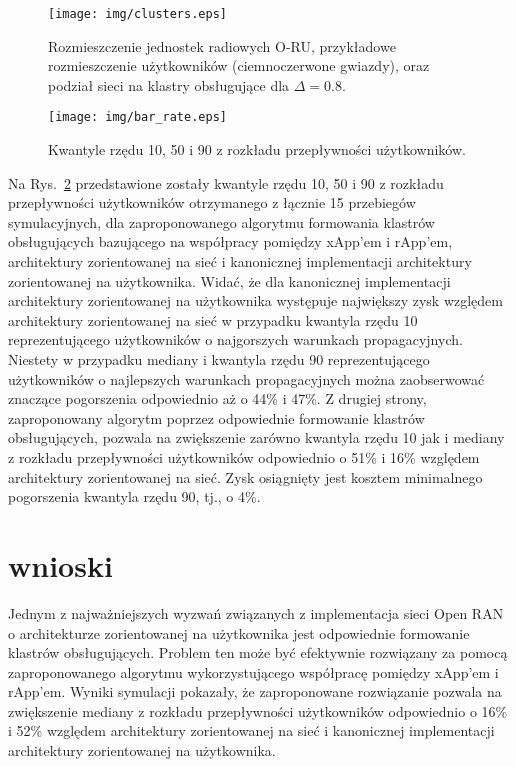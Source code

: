 \documentclass[a4paper]{article}
\begin{document}
\begin{multicols}{2}
\begin{figure}[H]
\centering
\texttt{[image: img/clusters.eps]}
\caption{Rozmieszczenie jednostek radiowych O-RU, przykładowe rozmieszczenie użytkowników (ciemnoczerwone gwiazdy), oraz podział sieci na klastry obsługujące dla $\Delta=0.8$.}
\label{fig:clusters}
\end{figure}
\begin{figure}[H]
\centering
\texttt{[image: img/bar\_rate.eps]}
\caption{Kwantyle rzędu 10, 50 i 90 z rozkładu przepływności użytkowników.}
\label{fig:bar_rate}
\end{figure}


Na Rys.~\ref{fig:bar_rate} przedstawione zostały kwantyle rzędu 10, 50 i 90 z rozkładu przepływności użytkowników otrzymanego z łącznie 15 przebiegów symulacyjnych, dla zaproponowanego algorytmu formowania klastrów obsługujących bazującego na współpracy pomiędzy xApp'em i rApp'em, architektury zorientowanej na sieć i kanonicznej implementacji architektury zorientowanej na użytkownika. Widać, że dla kanonicznej implementacji architektury zorientowanej na użytkownika występuje największy zysk względem architektury zorientowanej na sieć w przypadku kwantyla rzędu 10 reprezentującego użytkowników o najgorszych warunkach propagacyjnych. Niestety w przypadku mediany i kwantyla rzędu 90 reprezentującego użytkowników o najlepszych warunkach propagacyjnych można zaobserwować znaczące pogorszenia odpowiednio aż o 44\% i 47\%. Z drugiej strony, zaproponowany algorytm poprzez odpowiednie formowanie klastrów obsługujących, pozwala na zwiększenie zarówno kwantyla rzędu 10 jak i mediany z rozkładu przepływności użytkowników odpowiednio o 51\% i 16\% względem architektury zorientowanej na sieć. Zysk osiągnięty jest kosztem minimalnego pogorszenia kwantyla rzędu 90, tj., o 4\%.
\section{wnioski} \label{sec:conclusions}

Jednym z najważniejszych wyzwań związanych z implementacja sieci Open RAN o architekturze zorientowanej na użytkownika jest odpowiednie formowanie klastrów obsługujących. Problem ten może być efektywnie rozwiązany za pomocą zaproponowanego algorytmu wykorzystującego współpracę pomiędzy xApp'em i rApp'em. Wyniki symulacji pokazały, że zaproponowane rozwiązanie pozwala na zwiększenie mediany z rozkładu przepływności użytkowników odpowiednio o 16\% i 52\% względem architektury zorientowanej na sieć i kanonicznej implementacji architektury zorientowanej na użytkownika.




 



\end{multicols}
\end{document}
